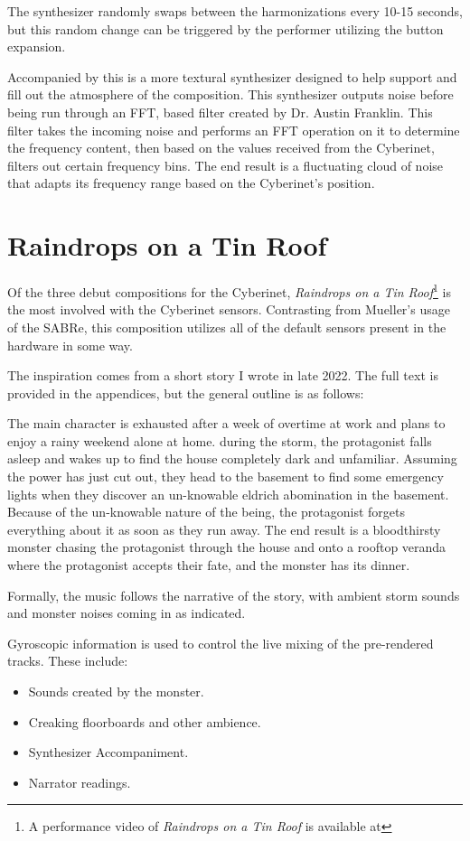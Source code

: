 The synthesizer randomly swaps between the harmonizations every 10-15 seconds, but this random change can be triggered by the performer utilizing the button expansion.

Accompanied by this is a more textural synthesizer designed to help support and fill out the atmosphere of the composition. This synthesizer outputs noise before being run through an FFT, based filter created by Dr. Austin Franklin. This filter takes the incoming noise and performs an FFT operation on it to determine the frequency content, then based on the values received from the Cyberinet, filters out certain frequency bins. The end result is a fluctuating cloud of noise that adapts its frequency range based on the Cyberinet's position.


\section{Raindrops on a Tin Roof}
Of the three debut compositions for the Cyberinet, \textit{Raindrops on a Tin Roof}\footnote{A performance video of \textit{Raindrops on a Tin Roof} is available at} is the most involved with the Cyberinet sensors. Contrasting from Mueller's usage of the SABRe, this composition utilizes all of the default sensors present in the hardware in some way. 

The inspiration comes from a short story I wrote in late 2022. The full text is provided in the appendices, but the general outline is as follows:

The main character is exhausted after a week of overtime at work and plans to enjoy a rainy weekend alone at home. during the storm, the protagonist falls asleep and wakes up to find the house completely dark and unfamiliar. Assuming the power has just cut out, they head to the basement to find some emergency lights when they discover an un-knowable eldrich abomination in the basement. Because of the un-knowable nature of the being, the protagonist forgets everything about it as soon as they run away. The end result is a bloodthirsty monster chasing the protagonist through the house and onto a rooftop veranda where the protagonist accepts their fate, and the monster has its dinner.

Formally, the music follows the narrative of the story, with ambient storm sounds and monster noises coming in as indicated. 

Gyroscopic information is used to control the live mixing of the pre-rendered tracks. These include:
\begin{itemize}
    \item Sounds created by the monster.
    \item Creaking floorboards and other ambience.
    \item Synthesizer Accompaniment.
    \item Narrator readings.
\end{itemize}

